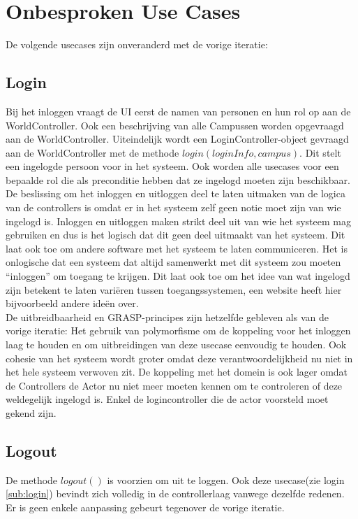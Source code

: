 \section{Onbesproken Use Cases\label{rest}}
De volgende usecases zijn onveranderd met de vorige iteratie:
\subsection{Login\label{sub:login}}
Bij het inloggen vraagt de UI eerst de namen van personen en hun rol op aan de WorldController. 
Ook een beschrijving van alle Campussen worden opgevraagd aan de WorldController. 
Uiteindelijk wordt een LoginController-object gevraagd aan de WorldController met de methode $login(loginInfo, campus)$. 
Dit stelt een ingelogde persoon voor in het systeem. 
Ook worden alle usecases voor een bepaalde rol die als preconditie hebben dat ze ingelogd moeten zijn beschikbaar.\\

De beslissing om het inloggen en uitloggen deel te laten uitmaken van de logica van de controllers is omdat er in het systeem zelf geen notie moet zijn van wie ingelogd is.
Inloggen en uitloggen maken strikt deel uit van wie het systeem mag gebruiken en dus is het logisch dat dit geen deel uitmaakt van het systeem. 
Dit laat ook toe om andere software met het systeem te laten communiceren. 
Het is onlogische dat een systeem dat altijd samenwerkt met dit systeem zou moeten ``inloggen'' om toegang te krijgen.
Dit laat ook toe om het idee van wat ingelogd zijn betekent te laten variëren tussen toegangssystemen, een website heeft hier bijvoorbeeld andere ideën over. \\

De uitbreidbaarheid en GRASP-principes zijn hetzelfde gebleven als van de vorige iteratie:
Het gebruik van polymorfisme om de koppeling voor het inloggen laag te houden en om uitbreidingen van deze usecase eenvoudig te houden. 
Ook cohesie van het systeem wordt groter omdat deze verantwoordelijkheid nu niet in het hele systeem verwoven zit. 
De koppeling met het domein is ook lager omdat de Controllers de Actor nu niet meer moeten kennen om te controleren of deze weldegelijk ingelogd is. 
Enkel de logincontroller die de actor voorsteld moet gekend zijn.

\subsection{Logout}
De methode $logout()$ is voorzien om uit te loggen. Ook deze usecase(zie login \ref{sub:login}) bevindt zich volledig in de controllerlaag vanwege dezelfde redenen.
Er is geen enkele aanpassing gebeurt tegenover de vorige iteratie.

